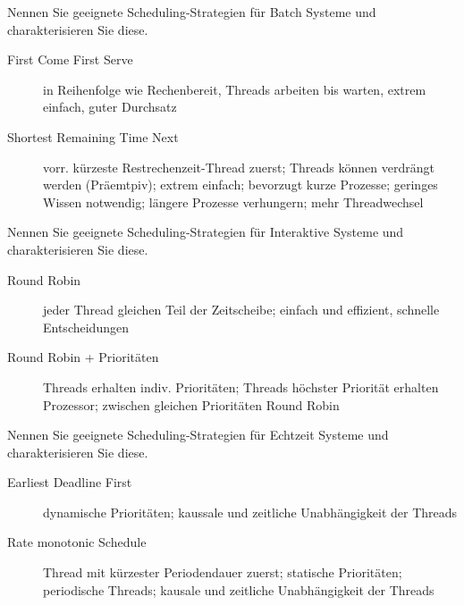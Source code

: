 \documentclass[avery5371]{flashcards}
\begin{document}
\begin{flashcard}{Nennen Sie geeignete Scheduling-Strategien für Batch Systeme und charakterisieren Sie diese.}
    \begin{description}
        \item[First Come First Serve] in Reihenfolge wie Rechenbereit, Threads arbeiten bis warten, extrem einfach, guter Durchsatz
        \item[Shortest Remaining Time Next] vorr. kürzeste Restrechenzeit-Thread zuerst; Threads können verdrängt werden (Präemtpiv); extrem einfach; bevorzugt kurze Prozesse; geringes Wissen notwendig; längere Prozesse verhungern; mehr Threadwechsel
    \end{description}
\end{flashcard}

\begin{flashcard}{Nennen Sie geeignete Scheduling-Strategien für Interaktive Systeme und charakterisieren Sie diese.}
    \begin{description}
        \item[Round Robin] jeder Thread gleichen Teil der Zeitscheibe; einfach und effizient, schnelle Entscheidungen
        \item[Round Robin + Prioritäten] Threads erhalten indiv. Prioritäten; Threads höchster Priorität erhalten Prozessor; zwischen gleichen Prioritäten Round Robin
    \end{description}
\end{flashcard}

\begin{flashcard}{Nennen Sie geeignete Scheduling-Strategien für Echtzeit Systeme und charakterisieren Sie diese.}
    \begin{description}
        \item[Earliest Deadline First] dynamische Prioritäten; kaussale und zeitliche Unabhängigkeit der Threads
        \item[Rate monotonic Schedule] Thread mit kürzester Periodendauer zuerst; statische Prioritäten; periodische Threads; kausale und zeitliche Unabhängigkeit der Threads
    \end{description}
\end{flashcard}
\end{document}
